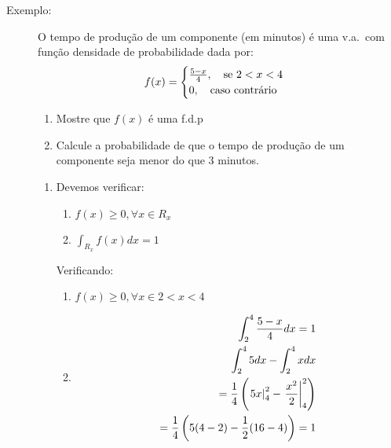 \begin{description}
\begin{description}
       \end{description}
     \item [Exemplo:] 
       O tempo de produção de um componente (em minutos) é uma v.a.\ com função densidade 
       de probabilidade dada por: 
       \begin{align}
         f(x)=
         \begin{cases}
           \frac{5-x}{4}, \text{\quad se $2<x<4$}\\
           0,\text{\quad caso contrário} 
         \end{cases}
       \end{align}
       \begin{enumerate}[label=(\alph*)]
         \item Mostre que $f(x)$ é uma f.d.p
         \item Calcule a probabilidade de que o tempo de produção de um componente 
           seja menor do que 3 minutos.
       \end{enumerate}
       \begin{enumerate}[label=(\alph*)]
         \item Devemos verificar: 
           \begin{enumerate}[leftmargin=*, label=\roman*., widest=IV, align=left] %
             \item $f(x)\geq 0, \forall x \in R_{x}$
             \item $\int_{R_{x}} f(x)dx=1$
           \end{enumerate}

           Verificando:
           \begin{enumerate}[leftmargin=*, label=\roman*., widest=IV, align=left] %
             \item $f(x)\geq 0, \forall x \in  2<x<4$
             \item 
               \begin{align*}
                 \int_{2}^4 \frac{5-x}{4}dx=1\\
                 \int_{2}^4 5 dx - \int_{2}^4 x dx  \\
                 = \frac{1}{4}  \left(\left.5x\right\rvert_{4}^{2} - \left.\frac{x^2}{2}\right\rvert_{4}^{2}\right) \\
                 = \frac{1}{4} \left(5(4-2)- \frac{1}{2}(16-4) \right)= 1
               \end{align*}


\end{enumerate}
\end{enumerate}
\end{description}
